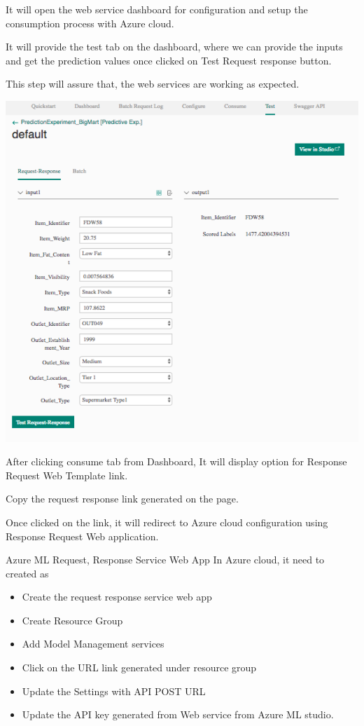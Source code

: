 It will open the web service dashboard for configuration and setup the 
consumption process with Azure cloud.

It will provide the test tab on the dashboard, where we can provide the 
inputs and get the prediction values once clicked on Test Request response 
button.

This step will assure that, the web services are working as expected.


\includegraphics[width=\columnwidth]{Images/mlstudio/Webserviceconf.png}


After clicking consume tab from Dashboard, It will display option for 
Response Request Web Template link.

Copy the request response link generated on the page.

Once clicked on the link, it will redirect to Azure cloud configuration 
using Response Request Web application.

Azure ML Request, Response Service Web App
In Azure cloud, it need to created as

\begin{itemize}
\item Create the request response service web app
\item Create Resource Group
\item Add Model Management services
\item Click on the URL link generated under resource group
\item Update the Settings with API POST URL
\item Update the API key generated from Web service from Azure ML studio.
\end{itemize}

